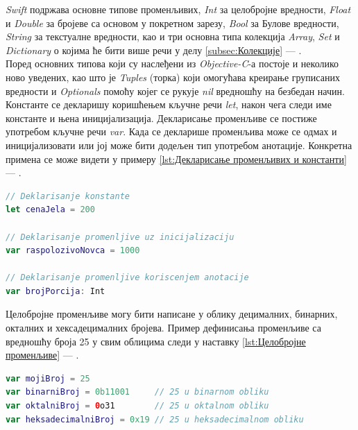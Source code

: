 \documentclass[12pt,oneside]{memoir}
\begin{document}
\indent \textit{Swift} подржава основне типове променљивих, \textit{Int} за целобројне вредности, \textit{Float} и \textit{Double} за бројеве са основом у покретном зарезу, \textit{Bool} за Булове вредности, \textit{String} за текстуалне вредности, као и три основна типа колекција \textit{Array}, \textit{Set} и \textit{Dictionary} о којима ће бити више речи у делу \ref{subsec:Колекције} --- . 
\\ 
\indent Поред основних типова који су наслеђени из \textit{Objective-C}-а постоје и неколико ново уведених, као што је \textit{Tuples} (торка) који омогућава креирање груписаних вредности и \textit{Optionals} помоћу којег се рукује \textit{nil} вредношћу на безбедан начин.
\\
\indent Константе се декларишу коришћењем кључне речи \textit{let}, након чега следи име константе и њена иницијализација. Декларисање променљиве се постиже употребом кључне речи \textit{var}. Када се декларише променљива може се одмах и иницијализовати или јој може бити додељен тип употребом анотације. Конкретна примена се може видети у примеру \ref{lst:Декларисање променљивих и константи} --- .

\begin{lstlisting}[caption=\textit{Декларисање променљивих и константи}, label={lst:Декларисање променљивих и константи}, language=Swift, frame=single]
// Deklarisanje konstante
let cenaJela = 200

// Deklarisanje promenljive uz inicijalizaciju
var raspolozivoNovca = 1000

// Deklarisanje promenljive koriscenjem anotacije
var brojPorcija: Int
\end{lstlisting}

\indent Целобројне променљиве могу бити написане у облику децималних, бинарних, окталних и хексадецималних бројева. Пример дефинисања променљиве са вредношћу броја 25 у свим облицима следи у наставку \ref{lst:Целобројне променљиве} --- .

\begin{lstlisting}[caption=\textit{{Целобројне променљиве}}, label={lst:Целобројне променљиве}, language=Swift, frame=single]
var mojiBroj = 25 
var binarniBroj = 0b11001     // 25 u binarnom obliku
var oktalniBroj = 0o31        // 25 u oktalnom obliku
var heksadecimalniBroj = 0x19 // 25 u heksadecimalnom obliku
\end{lstlisting}
\end{document}
